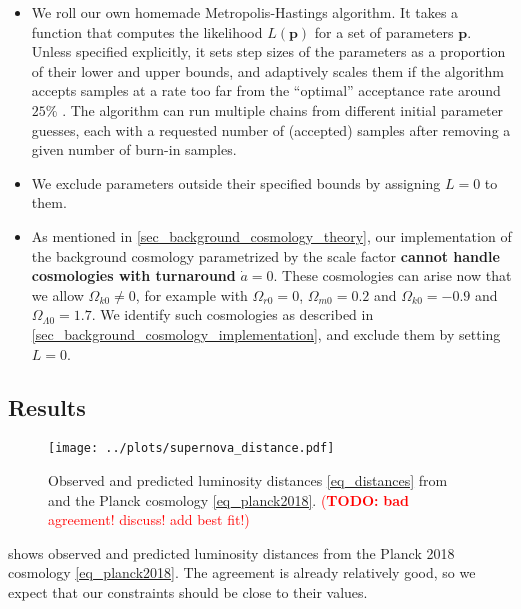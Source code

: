 \documentclass[10pt,a4paper]{article}
\newcommand\TODO[1]{\textcolor{red}{(\textbf{TODO:} #1)}}
\begin{document}
\begin{itemize}
	\item We roll our own homemade Metropolis-Hastings algorithm.
	      It takes a function that computes the likelihood $L(\mathbf{p})$ for a set of parameters $\mathbf{p}$.
	      Unless specified explicitly, it sets step sizes of the parameters as a proportion of their lower and upper bounds,
		  and adaptively scales them if the algorithm accepts samples at a rate too far from the ``optimal'' acceptance rate around $25\%$ \cite{gelmanWeakConvergenceOptimal1997}.
		  The algorithm can run multiple chains from different initial parameter guesses,
		  each with a requested number of (accepted) samples after removing a given number of burn-in samples.
	\item We exclude parameters outside their specified bounds by assigning $L=0$ to them.
	\item As mentioned in \cref{sec_background_cosmology_theory},
	      our implementation of the background cosmology parametrized by the scale factor
	      \textbf{cannot handle cosmologies with turnaround} $\dot{a} = 0$.
	      These cosmologies can arise now that we allow $\Omega_{k0} \neq 0$,
	      for example with $\Omega_{r0}=0$, $\Omega_{m0} = 0.2$ and $\Omega_{k0} = -0.9$ and $\Omega_{\Lambda0} = 1.7$.
	      We identify such cosmologies as described in \cref{sec_background_cosmology_implementation}, and exclude them by setting $L=0$.
\end{itemize}

\subsection{Results}

\begin{figure}[!b]
	\centering
	\texttt{[image: ../plots/supernova\_distance.pdf]}
	\caption{Observed and predicted luminosity distances \eqref{eq_distances} from \cite{betouleImprovedCosmologicalConstraints2014} and the Planck cosmology \eqref{eq_planck2018}. \TODO{\textbf{bad} agreement! discuss! add best fit!}}
	\label{fig_luminosity_distances}
\end{figure}

 shows observed and predicted luminosity distances from the Planck 2018 cosmology \eqref{eq_planck2018}.
The agreement is already relatively good, so we expect that our constraints should be close to their values.
\end{document}
